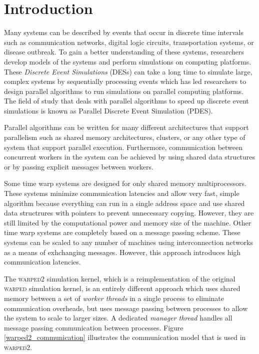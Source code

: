 \documentclass[11pt]{book}
\begin{document}
\tableofcontents \markright{ }
\listoffigures \markright{ }
\listoftables \markright{ }
\listofalgorithms \markright { }
\lstlistoflistings \markright{ }

\clearpage
{} \setcounter{page}{1}

\chapter{Introduction}\label{intro}

Many systems can be described by events that occur in discrete time intervals such as
communication networks, digital logic circuits, transportation systems, or disease
outbreak. To gain a better understanding of these systems, researchers develop models of
the systems and perform simulations on computing platforms. These \emph{Discrete Event
Simulations} (DESs) can take a long time to simulate large, complex systems by sequentially
processing events which has led researchers to design parallel algorithms to run simulations
on parallel computing platforms. The field of study that deals with parallel algorithms
to speed up discrete event simulations is known as Parallel Discrete Event Simulation (PDES).

Parallel algorithms can be written for many different architectures that support parallelism
such as shared memory architectures, clusters, or any other type of system that support
parallel execution. Furthermore, communication between concurrent workers in the system can
be achieved by using shared data structures or by passing explicit messages between workers.

Some time warp systems are designed for only shared memory multiprocessors. These systems
minimize communication latencies and allow very fast, simple algorithm because everything
can run in a single address space and use shared data structrures with pointers to prevent
unnecessary copying. However, they are still limited by the computational power and memory
size of the machine. Other time warp systems are completely based on a message passing scheme.
These systems can be scaled to any number of machines using interconnection networks as a means
of exhchanging messages. However, this approach introduces high communication latencies.

The \textsc{warped2} simulation kernel, which is a reimplementation of the original
\textsc{warped} simulation kernel, is an entirely different approach which uses shared
memory between a set of \emph{worker threads} in a single process to eliminate communication
overheads, but uses message passing between processes to allow the system to scale to larger
sizes. A dedicated \emph{manager thread} handles all message passing communication between
processes. Figure \ref{warped2_communication} illustrates the communication model that is
used in \textsc{warped2}.
\end{document}

